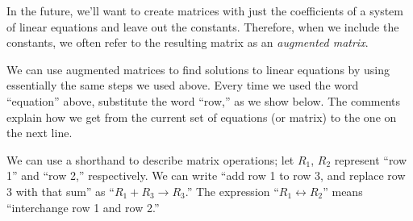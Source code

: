 In the future, we'll want to create matrices with just the coefficients of a system of linear equations and leave out the constants. Therefore, when we include the constants, we often refer to the resulting matrix as an \textit{augmented matrix}.

We can use augmented matrices to find solutions to linear equations by using essentially the same steps we used above. Every time we used the word ``equation'' above, substitute the word ``row,'' as we show below. The comments explain how we get from the current set of equations (or matrix) to the one on the next line. 

We can use a shorthand to describe matrix operations; let $R_1$, $R_2$ represent ``row 1'' and ``row 2,'' respectively. We can write ``add row 1 to row 3, and replace row 3 with that sum'' as ``$R_1+R_3\rightarrow R_3$.'' The expression ``$R_1 \leftrightarrow R_2$'' means ``interchange row 1 and row 2.''\\

